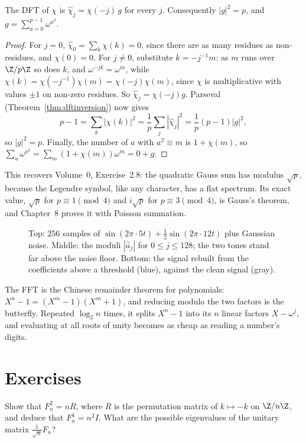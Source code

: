 \begin{proposition}\label{prop:gaussfourier}
The DFT of $\chi$ is $\hat\chi_j=\chi(-j)\,g$ for every $j$. Consequently $|g|^2=p$, and $g=\sum_{a=0}^{p-1}\omega^{a^2}$.
\end{proposition}
\begin{proof}
For $j=0$, $\hat\chi_0=\sum_k\chi(k)=0$, since there are as many residues as non-residues, and $\chi(0)=0$. For $j\ne0$, substitute $k=-j^{-1}m$:
as $m$ runs over $\Z/p\Z$ so does $k$, and $\omega^{-jk}=\omega^m$, while $\chi(k)=\chi(-j^{-1})\chi(m)=\chi(-j)\chi(m)$, since $\chi$ is multiplicative with
values $\pm1$ on non-zero residues. So $\hat\chi_j=\chi(-j)g$. Parseval (Theorem~\ref{thm:dftinversion}) now gives
\[
p-1=\sum_k|\chi(k)|^2=\frac1p\sum_j|\hat\chi_j|^2=\frac1p(p-1)|g|^2,
\]
so $|g|^2=p$. Finally, the number of $a$ with $a^2\equiv m$ is $1+\chi(m)$, so $\sum_a\omega^{a^2}=\sum_m(1+\chi(m))\omega^m=0+g$.
\end{proof}

This recovers Volume~0, Exercise~2.8: the quadratic Gauss sum has modulus $\sqrt p$, because the Legendre symbol, like any
character, has a flat spectrum. Its exact value, $\sqrt p$ for $p\equiv1\pmod4$ and $i\sqrt p$ for $p\equiv3\pmod4$, is Gauss's theorem, and
Chapter~8 proves it with Poisson summation.

\begin{figure}[ht]
\centering
{}
\caption{Top: $256$ samples of $\sin(2\pi\cdot5t)+\frac12\sin(2\pi\cdot12t)$ plus Gaussian noise. Middle: the moduli $|\hat a_j|$ for
$0\le j\le128$; the two tones stand far above the noise floor. Bottom: the signal rebuilt from the coefficients above a
threshold (blue), against the clean signal (gray).}
\label{fig:denoise}
\end{figure}

\begin{beauty}
The FFT is the Chinese remainder theorem for polynomials: $X^n-1=(X^m-1)(X^m+1)$, and reducing modulo the two factors is the
butterfly. Repeated $\log_2n$ times, it splits $X^n-1$ into its $n$ linear factors $X-\omega^j$, and evaluating at all roots of unity
becomes as cheap as reading a number's digits.
\end{beauty}

\section{Exercises}

\begin{exercise}[$\star$]\label{ex:dftorder}
Show that $F_n^2=nR$, where $R$ is the permutation matrix of $k\mapsto-k$ on $\Z/n\Z$, and deduce that $F_n^4=n^2I$. What are the possible
eigenvalues of the unitary matrix $\frac1{\sqrt n}F_n$?
\end{exercise}

